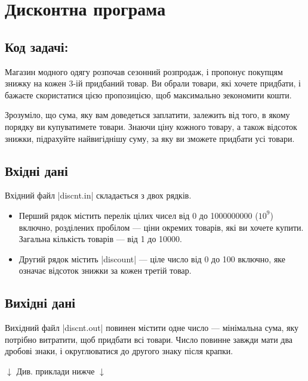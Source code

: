 \documentclass[12pt,a4paper]{article}
\begin{document}
\section*{Дисконтна програма \hfill {}}


\subsection*{Код задачі: }

Магазин модного одягу розпочав сезонний розпродаж, і пропонує покупцям знижку на кожен 3-ій придбаний товар.
Ви обрали товари, які хочете придбати, і бажаєте скористатися цією пропозицією, щоб максимально зекономити кошти.

Зрозуміло, що сума, яку вам доведеться заплатити, залежить від того, в якому порядку ви купуватимете товари.
Знаючи ціну кожного товару, а також відсоток знижки, підрахуйте найвигіднішу суму, за яку ви зможете придбати усі товари.


\subsection*{Вхідні дані}

Вхідний файл |discnt.in| складається з двох рядків.

\begin{itemize}
    \item Перший рядок містить перелік цілих чисел від 0 до 1000000000 (\(10 ^ 9\)) включно, розділених пробілом --- ціни окремих товарів, які ви хочете купити. Загальна кількість товарів --- від 1 до 10000.
    \item Другий рядок містить |discount| --- ціле число від 0 до 100 включно, яке означає відсоток знижки за кожен третій товар.
\end{itemize}


\subsection*{Вихідні дані}

Вихідний файл |discnt.out| повинен містити одне число --- мінімальна сума, яку потрібно витратити, щоб придбати всі товари. Число повинне завжди мати два дробові знаки, і округлюватися до другого знаку після крапки.


\begin{pagebottomtext}
$\downarrow$ Див. приклади нижче $\downarrow$
\end{pagebottomtext}
\end{document}
